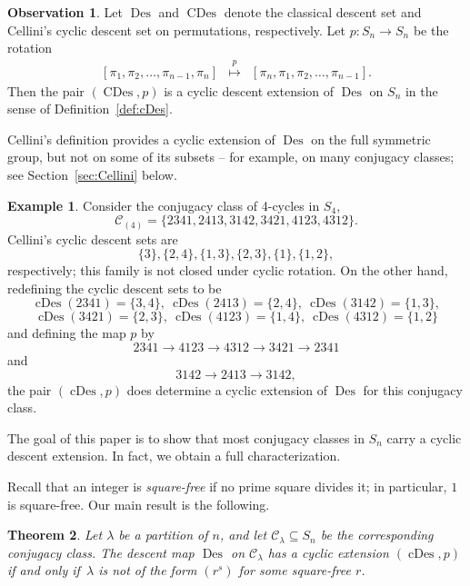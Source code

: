 \documentclass[10pt]{article}
\newtheorem{theorem}{Theorem}[section]
\theoremstyle{definition}
\newtheorem{example}[theorem]{Example}
\newcommand{\C}{\mathcal C}
\DeclareMathOperator\Des{Des}
\DeclareMathOperator\cDes{cDes}
\DeclareMathOperator\CDes{CDes}
\newtheorem{observation}[cdrthm]{Observation}
\begin{document}
\begin{observation}
    Let $\Des$ and $\CDes$ denote the classical descent set and Cellini's cyclic descent set on permutations, respectively.
    Let $p: S_n \rightarrow S_n$ be the rotation 
    \[
        \begin{array}{rcl}
            [\pi_1,\pi_2,\ldots,\pi_{n-1},\pi_n]&\overset{p}{\longmapsto}&
            [\pi_n,\pi_1,\pi_2,\ldots,\pi_{n-1}]. 
        \end{array}
    \]
    Then the pair $(\CDes,p)$ is a cyclic descent extension of $\Des$ on $S_n$ in the sense of Definition~\ref{def:cDes}.
\end{observation}
	
Cellini's definition provides a cyclic extension of $\Des$ on the full symmetric group, but not on some of its subsets -- for example, on many conjugacy classes;
see Section~\ref{sec:Cellini} below.

\begin{example}
    Consider the conjugacy class of 4-cycles in $S_4$,
    \[
        \C_{(4)}=\{2341, 2413, 3142, 3421, 4123, 4312\}.
    \]
    Cellini's cyclic descent sets are
    \[
        \{3\}, \{2,4\}, \{1,3\}, \{2,3\}, \{1\}, \{1,2\},
    \]
    respectively; this family is not closed under cyclic rotation.
    On the other hand, redefining the cyclic descent sets to be
    \[
        \cDes(2341)=\{3,4\},\ \cDes(2413)=\{2,4\}, \ \cDes(3142)=\{1,3\}, 
    \]
    \[
        \cDes(3421)=\{2,3\},\ \cDes(4123)=\{1,4\},\ \cDes(4312)=\{1,2\}
    \]
    and defining the map $p$ by
    \[
        2341 \rightarrow 4123 \rightarrow 4312 \rightarrow 3421 \rightarrow 2341
    \]
    and
    \[
        3142 \rightarrow 2413 \rightarrow 3142,
    \]
    the pair $(\cDes,p)$ does determine a cyclic extension of $\Des$ for this conjugacy class.
\end{example}
	
The goal of this paper is to show that most conjugacy classes in $S_n$ carry a cyclic descent extension.
In fact, we obtain a full characterization.

Recall that an integer is \emph{square-free} if no prime square divides it; in particular, $1$ is square-free. Our main result is the following. 
	
\begin{theorem}\label{thm:main}
    Let $\lambda$ be a partition of $n$, and let
    $\C_\lambda \subseteq S_n$ be the corresponding conjugacy class. 
    The descent map $\Des$ on $\C_\lambda$ has a cyclic extension $(\cDes,p)$ if and only if~$\lambda$ is not of the form $(r^s)$ for some square-free $r$.
\end{theorem}
	
\end{document}
